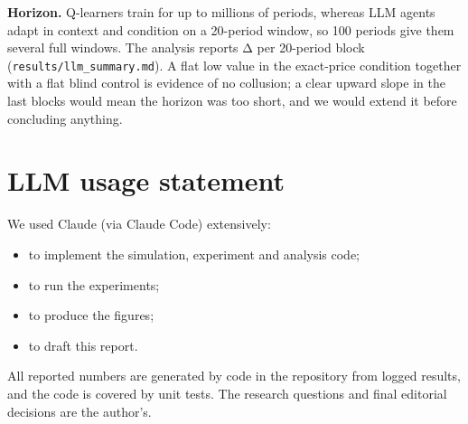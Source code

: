 \documentclass[11pt,a4paper]{article}
\providecommand{\tightlist}{\setlength{\itemsep}{1pt}\setlength{\parskip}{0pt}}
\begin{document}
\textbf{Horizon.} Q-learners train for up to millions of periods, whereas LLM agents adapt in context and condition on a 20-period window, so 100 periods give them several full windows. The analysis reports Δ per 20-period block (\texttt{results/llm\_summary.md}). A flat low value in the exact-price condition together with a flat blind control is evidence of no collusion; a clear upward slope in the last blocks would mean the horizon was too short, and we would extend it before concluding anything.

\hypertarget{llm-usage-statement}{%
\section{LLM usage statement}\label{llm-usage-statement}}

We used Claude (via Claude Code) extensively:

\begin{itemize}
\tightlist
\item
  to implement the simulation, experiment and analysis code;
\item
  to run the experiments;
\item
  to produce the figures;
\item
  to draft this report.
\end{itemize}

All reported numbers are generated by code in the repository from logged results, and the code is covered by unit tests. The research questions and final editorial decisions are the author's.
\end{document}
